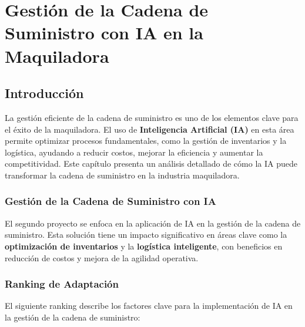 \section{Gestión de la Cadena de Suministro con IA en la Maquiladora}

\subsection{Introducción}

La gestión eficiente de la cadena de suministro es uno de los elementos clave para el éxito de la maquiladora. El uso de \textbf{Inteligencia Artificial (IA)} en esta área permite optimizar procesos fundamentales, como la gestión de inventarios y la logística, ayudando a reducir costos, mejorar la eficiencia y aumentar la competitividad. Este capítulo presenta un análisis detallado de cómo la IA puede transformar la cadena de suministro en la industria maquiladora.

\subsubsection{Gestión de la Cadena de Suministro con IA}

El segundo proyecto se enfoca en la aplicación de IA en la gestión de la cadena de suministro. Esta solución tiene un impacto significativo en áreas clave como la \textbf{optimización de inventarios} y la \textbf{logística inteligente}, con beneficios en reducción de costos y mejora de la agilidad operativa.

\subsubsection{Ranking de Adaptación}

El siguiente ranking describe los factores clave para la implementación de IA en la gestión de la cadena de suministro:

\begin{table}[H]
\centering
\caption{Ranking de Adaptación del Proyecto 2}
\end{table}

